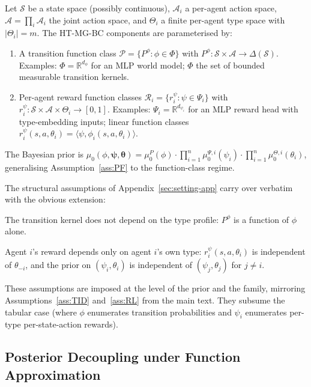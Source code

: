 Let $\mathcal{S}$ be a state space (possibly continuous), $\mathcal{A}_i$ a per-agent action space, $\mathcal{A} = \prod_i \mathcal{A}_i$ the joint action space, and $\Theta_i$ a finite per-agent type space with $|\Theta_i| = m$. The HT-MG-BC components are parameterised by:
\begin{enumerate}
\item A transition function class $\mathcal{P} = \{P^\phi: \phi \in \Phi\}$ with $P^\phi: \mathcal{S} \times \mathcal{A} \to \Delta(\mathcal{S})$. Examples: $\Phi = \mathbb{R}^{d_\phi}$ for an MLP world model; $\Phi$ the set of bounded measurable transition kernels.
\item Per-agent reward function classes $\mathcal{R}_i = \{r_i^{\psi}: \psi \in \Psi_i\}$ with $r_i^\psi: \mathcal{S} \times \mathcal{A} \times \Theta_i \to [0, 1]$. Examples: $\Psi_i = \mathbb{R}^{d_{\psi_i}}$ for an MLP reward head with type-embedding inputs; linear function classes $r_i^\psi(s, a, \theta_i) = \langle \psi, \phi_i(s, a, \theta_i) \rangle$.
\end{enumerate}
The Bayesian prior is $\mu_0(\phi, \boldsymbol{\psi}, \boldsymbol{\theta}) = \mu_0^P(\phi) \cdot \prod_{i=1}^n \mu_0^{\Psi, i}(\psi_i) \cdot \prod_{i=1}^n \mu_0^{\Theta, i}(\theta_i)$, generalising Assumption~\ref{ass:PF} to the function-class regime.

The structural assumptions of Appendix~\ref{sec:setting-app} carry over verbatim with the obvious extension:

\begin{assumption}
\label{ass:tid-fa}
The transition kernel does not depend on the type profile: $P^\phi$ is a function of $\phi$ alone.
\end{assumption}

\begin{assumption}
\label{ass:otrl-fa}
Agent $i$'s reward depends only on agent $i$'s own type: $r_i^\psi(s, a, \theta_i)$ is independent of $\theta_{-i}$, and the prior on $(\psi_i, \theta_i)$ is independent of $(\psi_j, \theta_j)$ for $j \neq i$.
\end{assumption}

These assumptions are imposed at the level of the prior and the family, mirroring Assumptions~\ref{ass:TID} and~\ref{ass:RL} from the main text. They subsume the tabular case (where $\phi$ enumerates transition probabilities and $\psi_i$ enumerates per-type per-state-action rewards).

\subsection{Posterior Decoupling under Function Approximation}
\label{app:fa-decoupling}

